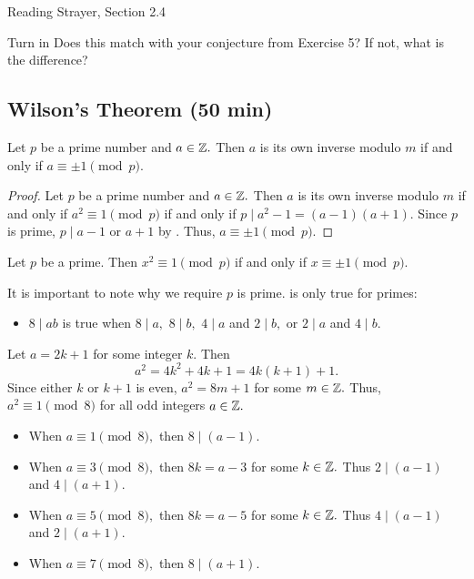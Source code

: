 \documentclass[letterpaper, 11 pt]{ximera}
\begin{document}
\begin{pre}
    \item[Reading] Strayer, Section 2.4

    \item[Turn in]
    Does this match with your conjecture from Exercise 5? If not, what is the difference?
\end{pre}

\subsection{Wilson's Theorem (50 min)}


\begin{lem*}[Lemma 2.10]\label{lem:sqrt1}
    Let $p$ be a prime number and $a\in\mathbb Z.$ Then $a$ is its own inverse modulo $m$ if and only if $a\equiv \pm 1\pmod{p}.$
\end{lem*}

\begin{proof}
    Let $p$ be a prime number and $a\in\mathbb Z.$ Then $a$ is its own inverse modulo $m$ if and only if $a^2\equiv 1 \pmod{p}$ if and only if $p\mid a^2-1=(a-1)(a+1).$ Since $p$ is prime, $p\mid a-1$ or $a+1$ by . Thus, $a\equiv\pm 1\pmod p.$
\end{proof}

\begin{corollary}\label{cor:sqrt1}
    Let $p$ be a prime. Then $x^2\equiv 1\pmod{p}$ if and only if $x\equiv \pm 1\pmod{p}.$
\end{corollary}

\begin{remark}
    It is important to note why we require $p$ is prime.  is only true for primes: 
    \begin{itemize}
        \item $8\mid ab$ is true when $8\mid a,$ $8\mid b,$ $4\mid a$ and $2\mid b,$ or $2\mid a$ and $4\mid b.$
    \end{itemize}
    Let $a=2k+1$ for some integer $k.$ Then 
    \[a^2=4k^2+4k+1=4k(k+1)+1.\]
    Since either $k$ or $k+1$ is even, $a^2=8m+1$ for some $m\in\mathbb Z.$ Thus, $a^2\equiv 1\pmod 8$ for all odd integers $a\in\mathbb Z.$

    \begin{itemize}
        \item When $a\equiv 1\pmod 8,$ then $8\mid (a-1).$
        \item When $a\equiv 3\pmod 8,$ then $8k=a-3$ for some $k\in\mathbb Z.$ Thus $2\mid (a-1)$ and $4\mid (a+1)$.
        \item When $a\equiv 5\pmod 8,$ then $8k=a-5$ for some $k\in\mathbb Z.$ Thus $4\mid (a-1)$ and $2\mid (a+1)$.
        \item When $a\equiv 7\pmod 8,$ then $8\mid (a+1).$
    \end{itemize}
\end{remark}
\end{document}

